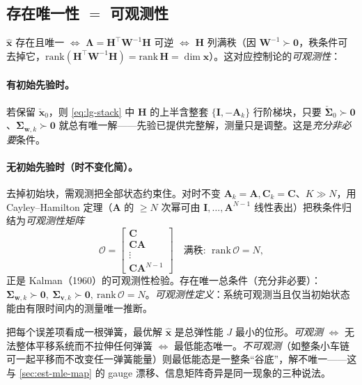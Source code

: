 \subsection{存在唯一性 $=$ 可观测性}
\label{sec:est-observability}

$\hat{\mathbf{x}}$ 存在且唯一 $\iff$ $\boldsymbol{\Lambda}=\mathbf{H}^\top\mathbf{W}^{-1}\mathbf{H}$ 可逆 $\iff$ $\mathbf{H}$ 列满秩（因 $\mathbf{W}^{-1}\succ\mathbf{0}$，秩条件可去掉它，$\mathrm{rank}(\mathbf{H}^\top\mathbf{W}^{-1}\mathbf{H})=\mathrm{rank}\,\mathbf{H}=\dim\mathbf{x}$）。这对应控制论的\emph{可观测性}\cite{barfoot2024state}：

\paragraph{有初始先验时。}
若保留 $\check{\mathbf{x}}_0$，则 \cref{eq:lg-stack} 中 $\mathbf{H}$ 的上半含整套 $\{\mathbf{I},-\mathbf{A}_k\}$ 行阶梯块，只要 $\check{\boldsymbol{\Sigma}}_0\succ\mathbf{0}$、$\boldsymbol{\Sigma}_{\mathbf{w},k}\succ\mathbf{0}$ 就总有唯一解——先验已提供完整解，测量只是调整。这是\emph{充分非必要}条件。

\paragraph{无初始先验时（时不变化简）。}
去掉初始块，需观测把全部状态约束住。对时不变 $\mathbf{A}_k=\mathbf{A},\mathbf{C}_k=\mathbf{C}$、$K\gg N$，用 Cayley–Hamilton 定理（$\mathbf{A}$ 的 $\ge N$ 次幂可由 $\mathbf{I},\dots,\mathbf{A}^{N-1}$ 线性表出）把秩条件归结为\emph{可观测性矩阵}
\begin{equation}
  \mathcal{O}=\begin{bmatrix}\mathbf{C}\\\mathbf{C}\mathbf{A}\\\vdots\\\mathbf{C}\mathbf{A}^{N-1}\end{bmatrix}\quad\text{满秩}:\ \ \mathrm{rank}\,\mathcal{O}=N,
  \label{eq:observability}
\end{equation}
正是 Kalman（1960）的可观测性检验。存在唯一总条件（充分非必要）：$\boldsymbol{\Sigma}_{\mathbf{w},k}\succ\mathbf{0},\ \boldsymbol{\Sigma}_{\mathbf{v},k}\succ\mathbf{0},\ \mathrm{rank}\,\mathcal{O}=N$。\emph{可观测性定义}：系统可观测当且仅当初始状态能由有限时间内的测量唯一推断。

\begin{insight}[质量–弹簧直觉]
把每个误差项看成一根弹簧，最优解 $\hat{\mathbf{x}}$ 是总弹性能 $J$ 最小的位形。\emph{可观测} $\iff$ 无法整体平移系统而不拉伸任何弹簧 $\iff$ 最低能态唯一。\emph{不可观测}（如整条小车链可一起平移而不改变任一弹簧能量）则最低能态是一整条“谷底”，解不唯一——这与 \cref{sec:est-mle-map} 的 gauge 漂移、信息矩阵奇异是同一现象的三种说法。
\end{insight}

